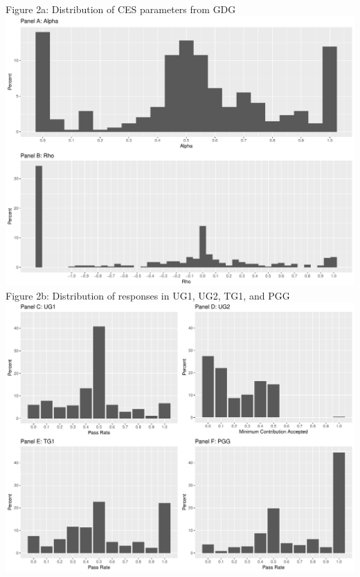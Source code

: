 \documentclass[12pt]{article}
\begin{document}
\noindent Figure 2a: Distribution of CES parameters from GDG \\
\includegraphics[scale=0.4]{Figure2a.pdf} \\



\noindent Figure 2b: Distribution of responses in UG1, UG2, TG1, and PGG \\ 
\includegraphics[scale=0.4]{Figure2b.pdf} \\
\end{document}
